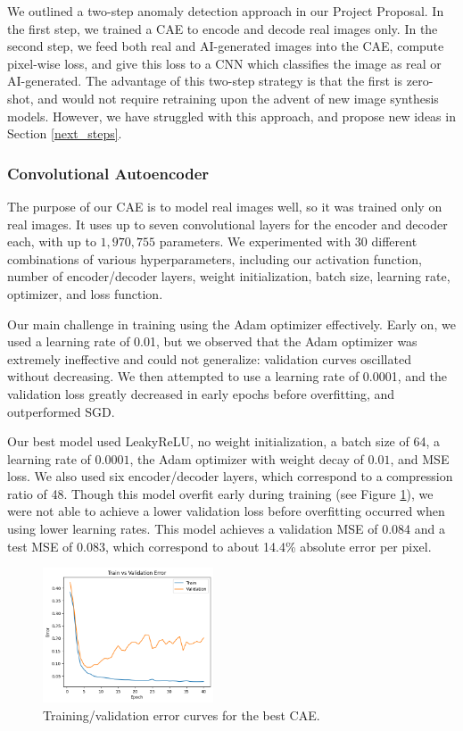 \documentclass{article} %
\begin{document}
We outlined a two-step anomaly detection approach in our Project Proposal. In the first step, we trained a CAE to encode and decode real images only. In the second step, we feed both real and AI-generated images into the CAE, compute pixel-wise loss, and give this loss to a CNN which classifies the image as real or AI-generated. The advantage of this two-step strategy is that the first is zero-shot, and would not require retraining upon the advent of new image synthesis models. However, we have struggled with this approach, and propose new ideas in Section \ref{next_steps}.

\subsubsection{Convolutional Autoencoder}

The purpose of our CAE is to model real images well, so it was trained only on real images. It uses up to seven convolutional layers for the encoder and decoder each, with up to $1,970,755$ parameters. We experimented with 30 different combinations of various hyperparameters, including our activation function, number of encoder/decoder layers, weight initialization, batch size, learning rate, optimizer, and loss function.

Our main challenge in training using the Adam optimizer effectively. Early on, we used a learning rate of 0.01, but we observed that the Adam optimizer was extremely ineffective and could not generalize: validation curves oscillated without decreasing. We then attempted to use a learning rate of 0.0001, and the validation loss greatly decreased in early epochs before overfitting, and outperformed SGD.

Our best model used LeakyReLU, no weight initialization, a batch size of 64, a learning rate of $0.0001$, the Adam optimizer with weight decay of $0.01$, and MSE loss. We also used six encoder/decoder layers, which correspond to a compression ratio of 48. Though this model overfit early during training (see Figure \ref{fig:cae_curves}), we were not able to achieve a lower validation loss before overfitting occurred when using lower learning rates. This model achieves a validation MSE of 0.084 and a test MSE of 0.083, which correspond to about 14.4\% absolute error per pixel.

\begin{figure}[h]
    \begin{center}
        \includegraphics[width=0.45\textwidth]{figs/cae_error_curves.png}
    \end{center}
    \caption{Training/validation error curves for the best CAE.}
    \label{fig:cae_curves}
\end{figure}
\end{document}

